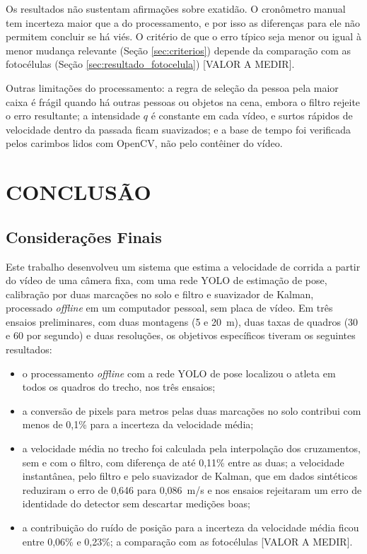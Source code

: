\documentclass[
    12pt,               %
    openright,          %
    twoside,            %
    a4paper,            %
    chapter=TITLE,      %
    english,            %
    brazil              %
    ]{abntex2}
\begin{document}
Os resultados não sustentam afirmações sobre exatidão. O cronômetro manual tem incerteza maior que a do processamento, e por isso as diferenças para ele não permitem concluir se há viés. O critério de que o erro típico seja menor ou igual à menor mudança relevante (Seção \ref{sec:criterios}) depende da comparação com as fotocélulas (Seção \ref{sec:resultado_fotocelula}) [VALOR A MEDIR].

Outras limitações do processamento: a regra de seleção da pessoa pela maior caixa é frágil quando há outras pessoas ou objetos na cena, embora o filtro rejeite o erro resultante; a intensidade $q$ é constante em cada vídeo, e surtos rápidos de velocidade dentro da passada ficam suavizados; e a base de tempo foi verificada pelos carimbos lidos com OpenCV, não pelo contêiner do vídeo.

\chapter{CONCLUSÃO}

\section{Considerações Finais}
Este trabalho desenvolveu um sistema que estima a velocidade de corrida a partir do vídeo de uma câmera fixa, com uma rede YOLO de estimação de pose, calibração por duas marcações no solo e filtro e suavizador de Kalman, processado \textit{offline} em um computador pessoal, sem placa de vídeo. Em três ensaios preliminares, com duas montagens (5 e 20~m), duas taxas de quadros (30 e 60 por segundo) e duas resoluções, os objetivos específicos tiveram os seguintes resultados:
\begin{itemize}
    \item o processamento \textit{offline} com a rede YOLO de pose localizou o atleta em todos os quadros do trecho, nos três ensaios;
    \item a conversão de pixels para metros pelas duas marcações no solo contribui com menos de 0,1\% para a incerteza da velocidade média;
    \item a velocidade média no trecho foi calculada pela interpolação dos cruzamentos, sem e com o filtro, com diferença de até 0,11\% entre as duas; a velocidade instantânea, pelo filtro e pelo suavizador de Kalman, que em dados sintéticos reduziram o erro de 0,646 para 0,086~m/s e nos ensaios rejeitaram um erro de identidade do detector sem descartar medições boas;
    \item a contribuição do ruído de posição para a incerteza da velocidade média ficou entre 0,06\% e 0,23\%; a comparação com as fotocélulas [VALOR A MEDIR].
\end{itemize}
\end{document}

